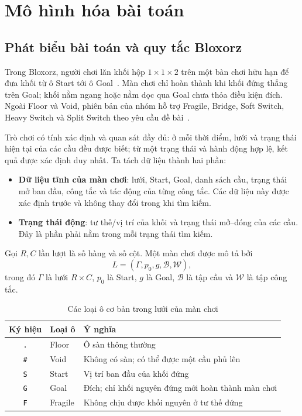 \section{Mô hình hóa bài toán}
\label{sec:model}

\subsection{Phát biểu bài toán và quy tắc Bloxorz}

Trong Bloxorz, người chơi lăn khối hộp $1\times1\times2$ trên một bàn chơi
hữu hạn để đưa khối từ ô Start tới ô Goal~\cite{coolmathbloxorz}. Màn chơi
chỉ hoàn thành khi khối đứng thẳng trên Goal; khối nằm ngang hoặc nằm dọc qua
Goal chưa thỏa điều kiện đích. Ngoài Floor và Void, phiên bản của nhóm hỗ trợ
Fragile, Bridge, Soft Switch, Heavy Switch và Split Switch theo yêu cầu đề
bài~\cite{projectspec2026}.

Trò chơi có tính xác định và quan sát đầy đủ: ở mỗi thời điểm, lưới và trạng
thái hiện tại của các cầu đều được biết; từ một trạng thái và hành động hợp lệ,
kết quả được xác định duy nhất. Ta tách dữ liệu thành hai phần:

\begin{itemize}
    \item \textbf{Dữ liệu tĩnh của màn chơi}: lưới, Start, Goal, danh sách cầu,
    trạng thái mở ban đầu, công tắc và tác động của từng công tắc. Các dữ liệu này
    được xác định trước và không thay đổi trong khi tìm kiếm.
    \item \textbf{Trạng thái động}: tư thế/vị trí của khối và trạng thái mở--đóng
    của các cầu. Đây là phần phải nằm trong mỗi trạng thái tìm kiếm.
\end{itemize}

Gọi $R,C$ lần lượt là số hàng và số cột. Một màn chơi được mô tả bởi
\begin{equation}
L=(\Gamma,p_0,g,\mathcal{B},\mathcal{W}),
\end{equation}
trong đó $\Gamma$ là lưới $R\times C$, $p_0$ là Start, $g$ là Goal,
$\mathcal{B}$ là tập cầu và $\mathcal{W}$ là tập công tắc.

\begin{table}[H]
\centering
\caption{Các loại ô cơ bản trong lưới của màn chơi}
\label{tab:grid-symbols}
\small
\begin{tabular}{@{}cll@{}}
\toprule
\textbf{Ký hiệu} & \textbf{Loại ô} & \textbf{Ý nghĩa} \\
\midrule
\texttt{.} & Floor & Ô sàn thông thường \\
\texttt{\#} & Void & Không có sàn; có thể được một cầu phủ lên \\
\texttt{S} & Start & Vị trí ban đầu của khối đứng \\
\texttt{G} & Goal & Đích; chỉ khối nguyên đứng mới hoàn thành màn chơi \\
\texttt{F} & Fragile & Không chịu được khối nguyên ở tư thế đứng \\
\bottomrule
\end{tabular}
\end{table}

